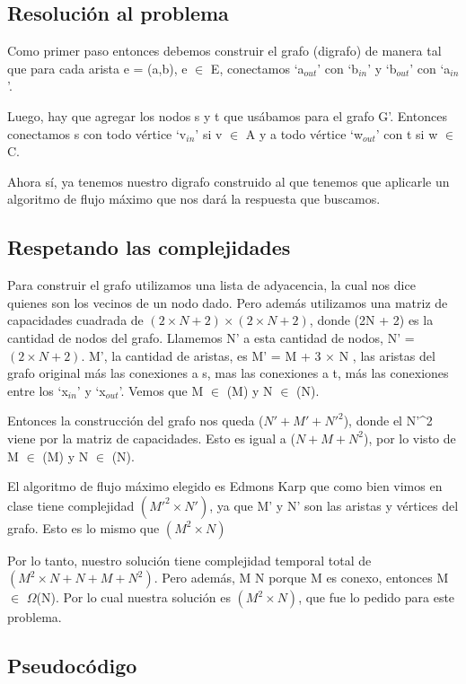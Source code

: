 \subsection{Resolución al problema}

Como primer paso entonces debemos construir el grafo (digrafo) de manera tal que para cada arista e = (a,b), e $\in$ E, conectamos `a$_{out}$' con `b$_{in}$' y `b$_{out}$' con `a$_{in}$'.

Luego, hay que agregar los nodos s y t que usábamos para el grafo G'. Entonces conectamos s con todo vértice `v$_{in}$' si v $\in$ A y a todo vértice `w$_{out}$' con t si w $\in$ C.

Ahora sí, ya tenemos nuestro digrafo construido al que tenemos que aplicarle un algoritmo de flujo máximo que nos dará la respuesta que buscamos.

\subsection{Respetando las complejidades}

Para construir el grafo utilizamos una lista de adyacencia, la cual nos dice quienes son los vecinos de un nodo dado. 
Pero además utilizamos una matriz de capacidades cuadrada de $(2\times N + 2) \times (2\times N + 2)$, donde (2\times N + 2) es la cantidad de nodos del grafo. 
Llamemos N' a esta cantidad de nodos, N' = $(2\times N + 2)$. M', la cantidad de aristas, es M' = M + 3 $\times$ N , las aristas del grafo original más las conexiones a 
s, mas las conexiones a t, más las conexiones entre los `x$_{in}$' y `x$_{out}$'. Vemos que M $\in$ \bigo(M) y N $\in$ \bigo(N).

Entonces la construcción del grafo nos queda \bigo($N' + M' + N'^2$), donde el N'^2 viene por la matriz de capacidades. Esto es igual a \bigo($N + M + N^2$), por lo visto de M $\in$ \bigo(M) y N $\in$ \bigo(N).

El algoritmo de flujo máximo elegido es Edmons Karp que como bien vimos en clase tiene complejidad \bigo$(M'^2 \times N')$, ya que M' y N' son las aristas y vértices del grafo. 
Esto es lo mismo que \bigo$(M^2 \times N)$

Por lo tanto, nuestro solución tiene complejidad temporal total de \bigo$(M^2 \times N + N + M + N^2 )$. Pero además, M \geq N porque M es conexo, entonces M $\in$ $\Omega$(N).
Por lo cual nuestra solución es \bigo$(M^2 \times N )$, que fue lo pedido para este problema.

\subsection{Pseudocódigo}
	
